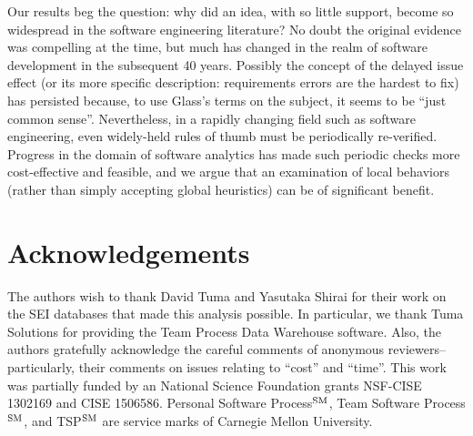 \documentclass[smallcondesed]{svjour3}
\begin{document}
Our results beg the question: why did an idea, with so little support, become so widespread in the software engineering literature? No doubt the original evidence was compelling at the time, but much has changed in the realm of software development in the subsequent 40 years. Possibly the concept of the delayed issue effect (or its more specific description: requirements errors are the hardest to fix)
has persisted because, to use Glass's terms on the subject, it seems to be ``just common sense''\cite{glass02}. 
Nevertheless, in a rapidly changing field such as software engineering, even widely-held rules of thumb must be periodically re-verified. 
Progress in the domain of software analytics has made such periodic checks more cost-effective and feasible, and we argue that an examination of local behaviors (rather than simply accepting global heuristics) can be of significant benefit.

 



\section*{Acknowledgements}
The authors wish to thank  David Tuma and  Yasutaka Shirai for their work on the SEI databases
that made this analysis possible.
In particular, we thank Tuma Solutions for providing the Team Process Data Warehouse software.
Also, the authors gratefully acknowledge the careful comments of anonymous reviewers-- particularly, their comments on issues relating to ``cost''
and ``time''.
This work was partially funded by an National Science
Foundation grants NSF-CISE 1302169 and CISE 1506586.
Personal Software Process$\textsuperscript{SM}$, Team Software Process$\textsuperscript{SM}$, and TSP$\textsuperscript{SM}$ are service marks of Carnegie Mellon University.

 
\vspace*{0.5mm} 
\balance

 
\end{document}
